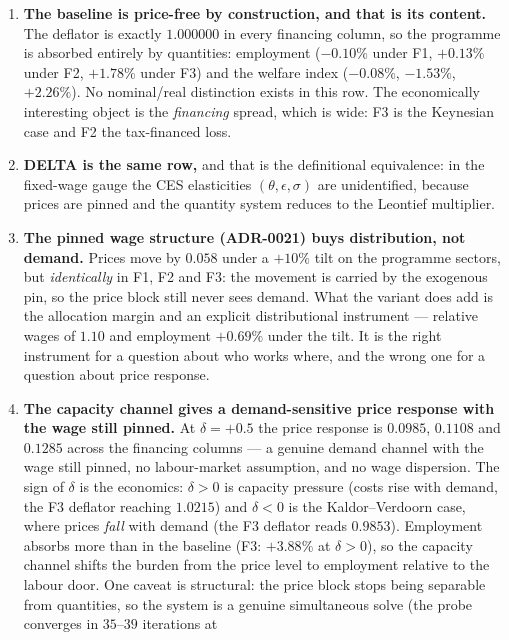 \documentclass[11pt]{article}
\begin{document}
\begin{enumerate}
\item \textbf{The baseline is price-free by construction, and that is its
      content.} The deflator is exactly $1.000000$ in every financing column, so
      the programme is absorbed entirely by quantities: employment
      ($-0.10\%$ under F1, $+0.13\%$ under F2, $+1.78\%$ under F3) and the
      welfare index ($-0.08\%$, $-1.53\%$, $+2.26\%$). No nominal/real
      distinction exists in this row. The economically interesting object is the
      \emph{financing} spread, which is wide: F3 is the Keynesian case and F2
      the tax-financed loss.
\item \textbf{DELTA is the same row,} and that is the definitional equivalence:
      in the fixed-wage gauge the CES elasticities $(\theta,\epsilon,\sigma)$
      are unidentified, because prices are pinned and the quantity system
      reduces to the Leontief multiplier.
\item \textbf{The pinned wage structure (ADR-0021) buys distribution, not
      demand.} Prices move by $0.058$ under a $+10\%$ tilt on the programme
      sectors, but \emph{identically} in F1, F2 and F3: the movement is carried
      by the exogenous pin, so the price block still never sees demand. What the
      variant does add is the allocation margin and an explicit distributional
      instrument --- relative wages of $1.10$ and employment $+0.69\%$ under the
      tilt. It is the right instrument for a question about who works where, and
      the wrong one for a question about price response.
\item \textbf{The capacity channel gives a demand-sensitive price response with
      the wage still pinned.} At $\delta = +0.5$ the price response is $0.0985$, $0.1108$
      and $0.1285$ across the financing columns --- a genuine demand channel
      with the wage still pinned, no labour-market assumption, and no wage
      dispersion. The sign of $\delta$ is the economics: $\delta > 0$ is
      capacity pressure (costs rise with demand, the F3 deflator reaching
      $1.0215$) and $\delta < 0$ is the Kaldor--Verdoorn case, where prices
      \emph{fall} with demand (the F3 deflator reads $0.9853$). Employment
      absorbs more than in the baseline (F3: $+3.88\%$ at $\delta > 0$), so the
      capacity channel shifts the burden from the price level to employment
      relative to the labour door. One caveat is structural: the price block
      stops being separable from quantities, so the system is a genuine
      simultaneous solve (the probe converges in $35$--$39$ iterations at

\end{enumerate}
\end{document}
